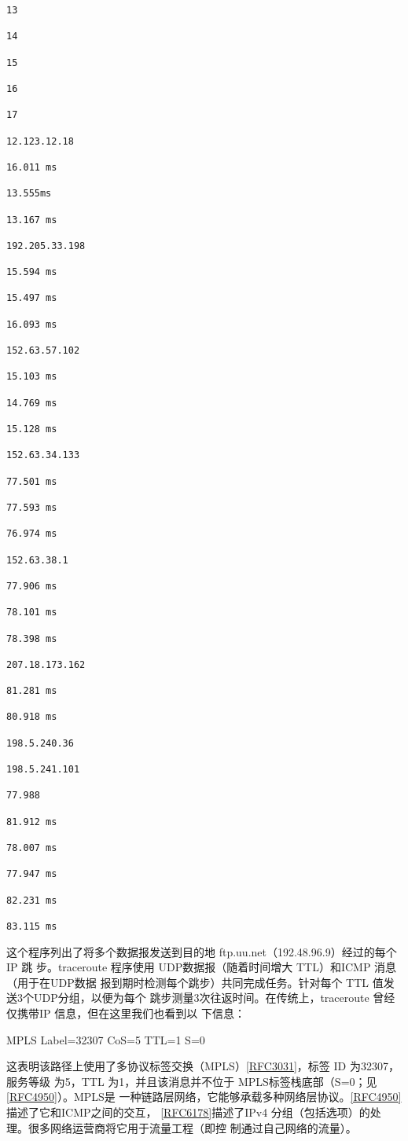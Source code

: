 \begin{verbatim}
13

14

15

16

17

12.123.12.18

16.011 ms

13.555ms

13.167 ms

192.205.33.198

15.594 ms

15.497 ms

16.093 ms

152.63.57.102

15.103 ms

14.769 ms

15.128 ms

152.63.34.133

77.501 ms

77.593 ms

76.974 ms

152.63.38.1

77.906 ms

78.101 ms

78.398 ms

207.18.173.162

81.281 ms

80.918 ms

198.5.240.36

198.5.241.101

77.988

81.912 ms

78.007 ms

77.947 ms

82.231 ms

83.115 ms
\end{verbatim}

这个程序列出了将多个数据报发送到目的地 ftp.uu.net（192.48.96.9）经过的每个IP 跳
步。traceroute 程序使用 UDP数据报（随着时间增大 TTL）和ICMP 消息（用于在UDP数据
报到期时检测每个跳步）共同完成任务。针对每个 TTL 值发送3个UDP分组，以便为每个
跳步测量3次往返时间。在传统上，traceroute 曾经仅携带IP 信息，但在这里我们也看到以
下信息：

MPLS Label=32307 CoS=5 TTL=1 S=0

这表明该路径上使用了多协议标签交换（MPLS）\href{https://www.rfc-editor.org/rfc/rfc3031}{[RFC3031]}，标签 ID 为32307，服务等级
为5，TTL 为1，并且该消息并不位于 MPLS标签栈底部（S=0；见\href{https://www.rfc-editor.org/rfc/rfc4950}{[RFC4950]}）。MPLS是
一种链路层网络，它能够承载多种网络层协议。\href{https://www.rfc-editor.org/rfc/rfc4950}{[RFC4950]}描述了它和ICMP之间的交互，
\href{https://www.rfc-editor.org/rfc/rfc6178}{[RFC6178]}描述了IPv4 分组（包括选项）的处理。很多网络运营商将它用于流量工程（即控
制通过自己网络的流量）。

